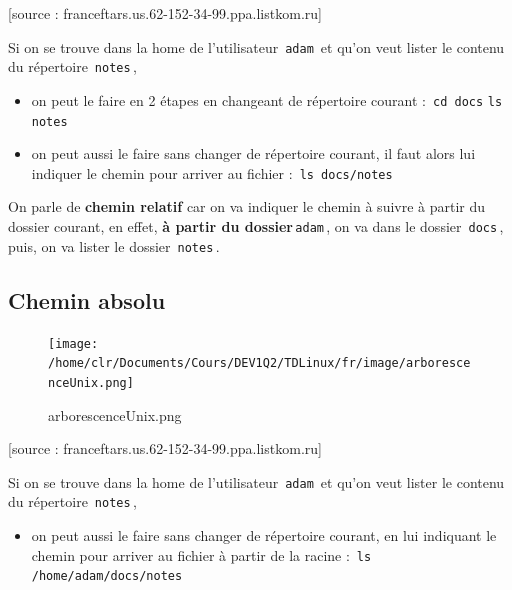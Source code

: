 \documentclass[11pt,a4paper]{article}
\begin{document}
			    
			    [source : franceftars.us.62-152-34-99.ppa.listkom.ru]
        
            \par
        
        Si on se trouve dans la home de l'utilisateur \,\verb|adam|\, et qu'on veut lister le contenu du r\'epertoire \,\verb|notes|\,,
        
					\begin{itemize}
				
			\item 
            on peut le faire en 2 \'etapes en changeant de r\'epertoire courant :
            \,\verb|cd docs|\,\,\verb|ls notes|\,
			\item 
            on peut aussi le faire sans changer de r\'epertoire courant, 
            il faut alors lui indiquer le chemin pour arriver au fichier :
            \,\verb|ls docs/notes|\,
					\end{itemize}
				
        On parle de  \textbf{chemin relatif} car on va indiquer le chemin \`a suivre \`a partir du dossier courant,
        en effet, \textbf{\`a partir du dossier}\,\verb|adam|\,,
        on va dans le dossier \,\verb|docs|\,, puis, on va lister le dossier \,\verb|notes|\,.
        
            \par
        \subsection{Chemin absolu}\begin{figure}[hbt]
				    \begin{center}
					\texttt{[image: /home/clr/Documents/Cours/DEV1Q2/TDLinux/fr/image/arborescenceUnix.png]}
						\end{center}
                
                    \caption[arborescenceUnix.png]{arborescenceUnix.png}
                \end{figure}
                    
			    
			    [source : franceftars.us.62-152-34-99.ppa.listkom.ru]
        
            \par
        
        Si on se trouve dans la home de l'utilisateur \,\verb|adam|\, et qu'on veut lister le contenu du r\'epertoire \,\verb|notes|\,,
        
					\begin{itemize}
				
			\item 
            on peut aussi le faire sans changer de r\'epertoire courant, 
            en lui indiquant le chemin pour arriver au fichier \`a partir de la racine :
            \,\verb|ls /home/adam/docs/notes|\,
					\end{itemize}
				
\end{document}
